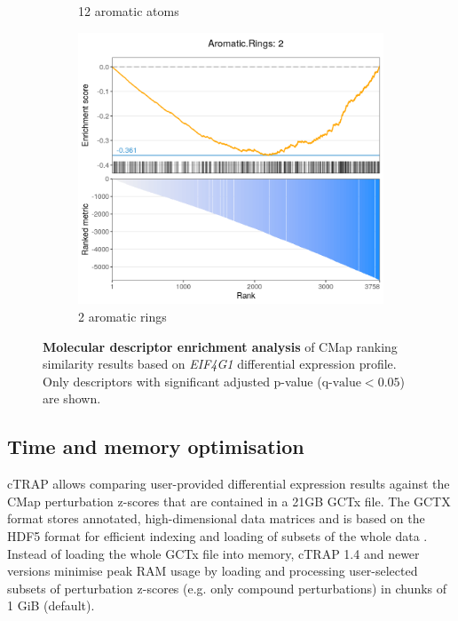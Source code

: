 \begin{figure}[!h]
\begin{subfigure}[h]{0.32\textwidth}
		\caption{\footnotesize{12 aromatic atoms}}
	\end{subfigure}
	\begin{subfigure}[h]{0.32\textwidth}
		\includegraphics[width=\textwidth]{images/ctrap/molecular-descriptors-c}
		\caption{\footnotesize{2 aromatic rings}}
	\end{subfigure}
	\caption[Molecular descriptor enrichment analysis]{\textbf{Molecular descriptor enrichment analysis} of CMap ranking similarity results based on \emph{EIF4G1} differential expression profile. Only descriptors with significant adjusted p-value ($\textrm{q-value} < 0.05$) are shown.}
	\label{fig:ctrap-descriptors}
\end{figure}

\subsection{Time and memory optimisation}
\label{subsec:ctrap-optim}

cTRAP allows comparing user-provided differential expression results against the CMap perturbation z-scores that are contained in a 21GB GCTx file. The GCTX format stores annotated, high-dimensional data matrices and is based on the HDF5 format for efficient indexing and loading of subsets of the whole data \cite{enache:2018wq}. Instead of loading the whole GCTx file into memory, cTRAP 1.4 and newer versions minimise peak RAM usage by loading and processing user-selected subsets of perturbation z-scores (e.g. only compound perturbations) in chunks of 1 GiB (default).

